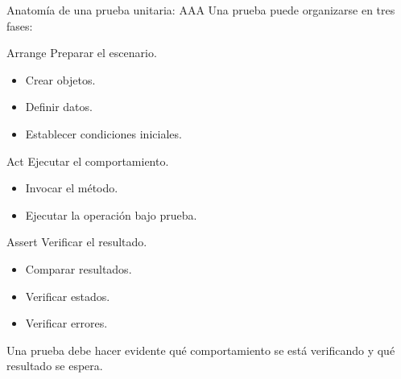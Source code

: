 \documentclass[11pt,aspectratio=169]{beamer}
\begin{document}
\begin{frame}{Anatomía de una prueba unitaria: AAA}
Una prueba puede organizarse en tres fases:

\begin{threecol}
  \begin{block}{Arrange}
    Preparar el escenario.
    \begin{itemize}
      \item Crear objetos.
      \item Definir datos.
      \item Establecer condiciones iniciales.
    \end{itemize}
  \end{block}
\nextcol
  \begin{block}{Act}
    Ejecutar el comportamiento.
    \begin{itemize}
      \item Invocar el método.
      \item Ejecutar la operación bajo prueba.
    \end{itemize}
  \end{block}
\nextcol
  \begin{block}{Assert}
    Verificar el resultado.
    \begin{itemize}
      \item Comparar resultados.
      \item Verificar estados.
      \item Verificar errores.
    \end{itemize}
  \end{block}
\end{threecol}

\begin{callout}[halign=center]
  Una prueba debe hacer evidente qué comportamiento se está verificando y qué
  resultado se espera.
\end{callout}
\end{frame}
\end{document}
